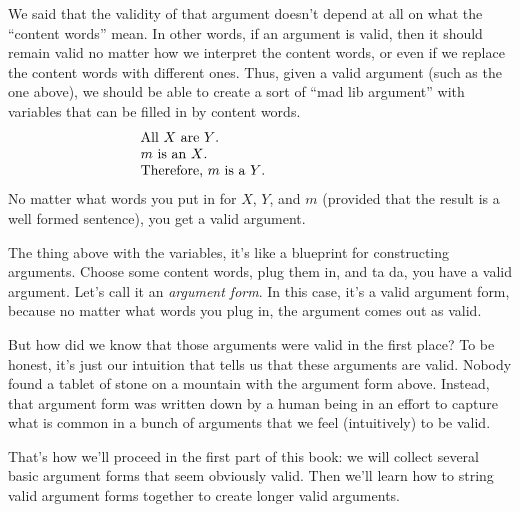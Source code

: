  We said that the validity of that argument doesn't depend at all on
 what the ``content words'' mean.  In other words, if an argument is
 valid, then it should remain valid no matter how we interpret the
 content words, or even if we replace the content words with different
 ones.  Thus, given a valid argument (such as the one above), we
 should be able to create a sort of ``mad lib argument'' with
 variables that can be filled in by content words.
 \[ \begin{array}{p{6cm}}
      All $X$ are $Y$.  \\ $m$ is an $X$. \\
      Therefore, $m$ is a $Y$. \end{array} \] 
 No matter what words you put in for $X$, $Y$, and $m$ (provided that
 the result is a well formed sentence), you get a valid argument.

 The thing above with the variables, it's like a blueprint for
 constructing arguments.  Choose some content words, plug them in, and
 ta da, you have a valid argument.  Let's call it an \emph{argument
   form}.  In this case, it's a valid argument form, because no matter
 what words you plug in, the argument comes out as valid.

 But how did we know that those arguments were valid in the first
 place?  To be honest, it's just our intuition that tells us that
 these arguments are valid.  Nobody found a tablet of stone on a
 mountain with the argument form above.  Instead, that argument form
 was written down by a human being in an effort to capture what is
 common in a bunch of arguments that we feel (intuitively) to be
 valid.

 That's how we'll proceed in the first part of this book: we will
 collect several basic argument forms that seem obviously valid.  Then
 we'll learn how to string valid argument forms together to create
 longer valid arguments.

